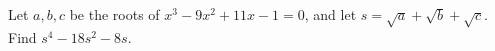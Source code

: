 Let $a,b,c$ be the roots of $x^3-9x^2+11x-1=0$, and let $s=\sqrt a+\sqrt b+\sqrt c$. Find $s^4-18s^2-8s$.
